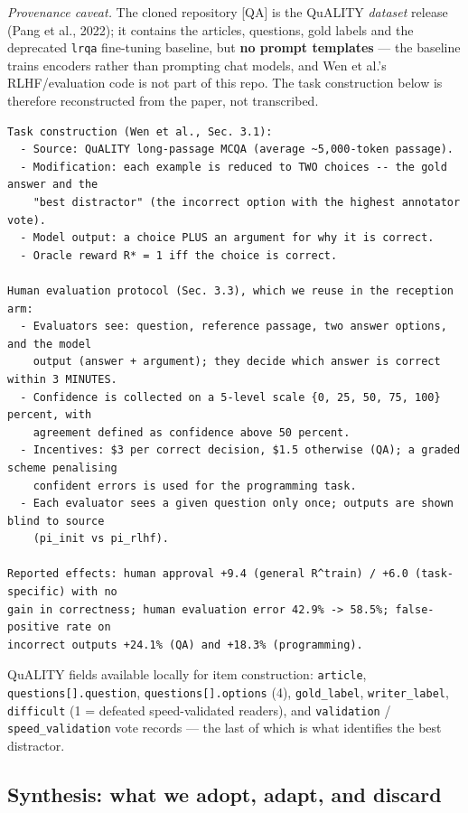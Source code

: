 \documentclass[11pt]{article}
\begin{document}
\noindent\emph{Provenance caveat.} The cloned repository [QA] is the
QuALITY \emph{dataset} release (Pang et al., 2022); it contains the
articles, questions, gold labels and the deprecated \texttt{lrqa}
fine-tuning baseline, but \textbf{no prompt templates} --- the baseline
trains encoders rather than prompting chat models, and Wen et al.'s
RLHF/evaluation code is not part of this repo. The task construction
below is therefore reconstructed from the paper, not transcribed.

\begin{lstlisting}
Task construction (Wen et al., Sec. 3.1):
  - Source: QuALITY long-passage MCQA (average ~5,000-token passage).
  - Modification: each example is reduced to TWO choices -- the gold answer and the
    "best distractor" (the incorrect option with the highest annotator vote).
  - Model output: a choice PLUS an argument for why it is correct.
  - Oracle reward R* = 1 iff the choice is correct.

Human evaluation protocol (Sec. 3.3), which we reuse in the reception arm:
  - Evaluators see: question, reference passage, two answer options, and the model
    output (answer + argument); they decide which answer is correct within 3 MINUTES.
  - Confidence is collected on a 5-level scale {0, 25, 50, 75, 100} percent, with
    agreement defined as confidence above 50 percent.
  - Incentives: $3 per correct decision, $1.5 otherwise (QA); a graded scheme penalising
    confident errors is used for the programming task.
  - Each evaluator sees a given question only once; outputs are shown blind to source
    (pi_init vs pi_rlhf).

Reported effects: human approval +9.4 (general R^train) / +6.0 (task-specific) with no
gain in correctness; human evaluation error 42.9% -> 58.5%; false-positive rate on
incorrect outputs +24.1% (QA) and +18.3% (programming).
\end{lstlisting}

\noindent QuALITY fields available locally for item construction:
\texttt{article}, \texttt{questions[].question},
\texttt{questions[].options} (4), \texttt{gold\_label},
\texttt{writer\_label}, \texttt{difficult} (1 = defeated
speed-validated readers), and \texttt{validation} /
\texttt{speed\_validation} vote records --- the last of which is what
identifies the best distractor.

\subsection{Synthesis: what we adopt, adapt, and discard}
\label{app:synthesis}
\end{document}
